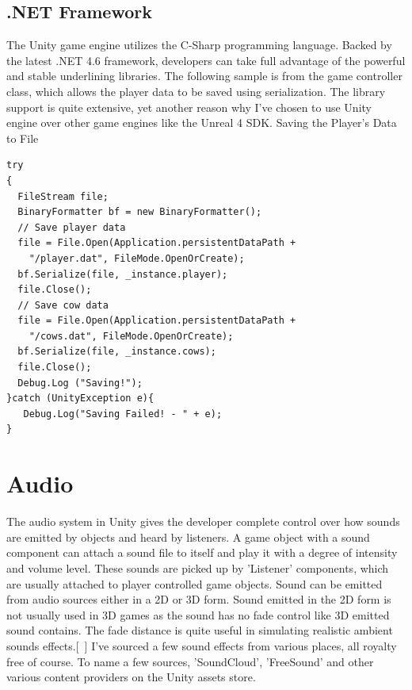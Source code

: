 \subsection{.NET Framework}
The Unity game engine utilizes the C-Sharp programming language. Backed by the latest .NET 4.6 framework, developers can take full advantage of the powerful and stable underlining libraries. 
The following sample is from the game controller class, which allows the player data to be saved using serialization. The library support is quite extensive, yet another reason why I've chosen to use Unity engine over other game engines like the Unreal 4 SDK.
Saving the Player's Data to File
\begin{verbatim}
try
{
  FileStream file;
  BinaryFormatter bf = new BinaryFormatter();
  // Save player data
  file = File.Open(Application.persistentDataPath + 
    "/player.dat", FileMode.OpenOrCreate);
  bf.Serialize(file, _instance.player);
  file.Close();
  // Save cow data
  file = File.Open(Application.persistentDataPath + 
    "/cows.dat", FileMode.OpenOrCreate);
  bf.Serialize(file, _instance.cows);
  file.Close();
  Debug.Log ("Saving!");
}catch (UnityException e){
   Debug.Log("Saving Failed! - " + e);
}
\end{verbatim}
\section{Audio}
The audio system in Unity gives the developer complete control over how sounds are emitted by objects and heard by listeners. A game object with a sound component can attach a sound file to itself and play it with a degree of intensity and volume level. These sounds are picked up by 'Listener' components, which are usually attached to player controlled game objects. Sound can be emitted from audio sources either in a 2D or 3D form. Sound emitted in the 2D form is not usually used in 3D games as the sound has no fade control like 3D emitted sound contains. The fade distance is quite useful in simulating realistic ambient sounds effects.[~\cite{Audio-System}]
I’ve sourced a few sound effects from various places, all royalty free of course. To name a few sources, 'SoundCloud', 'FreeSound' and other various content providers on the Unity assets store.

